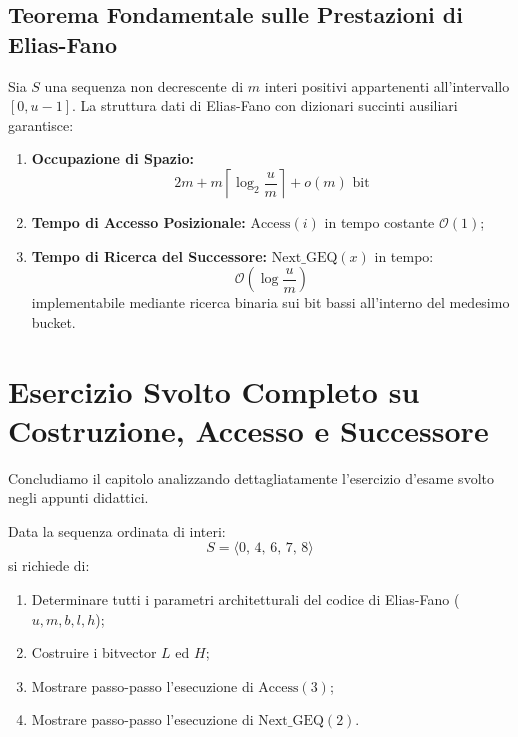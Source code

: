 \FloatBarrier
\subsection{Teorema Fondamentale sulle Prestazioni di Elias-Fano}
\label{subsec:teorema-elias-fano}

\begin{theorem}
Sia $S$ una sequenza non decrescente di $m$ interi positivi appartenenti all'intervallo $[0, u - 1]$. La struttura dati di Elias-Fano con dizionari succinti ausiliari garantisce:
\begin{enumerate}
  \item \textbf{Occupazione di Spazio:}
  \begin{equation}
    2m + m \left\lceil \log_2 \frac{u}{m} \right\rceil + o(m) \text{ bit}
  \end{equation}
  \item \textbf{Tempo di Accesso Posizionale:} $\text{Access}(i)$ in tempo costante $\mathcal{O}(1)$;
  \item \textbf{Tempo di Ricerca del Successore:} $\text{Next\_GEQ}(x)$ in tempo:
  \begin{equation}
    \mathcal{O}\left( \log \frac{u}{m} \right)
  \end{equation}
  implementabile mediante ricerca binaria sui bit bassi all'interno del medesimo bucket.
\end{enumerate}
\end{theorem}

\FloatBarrier
\section{Esercizio Svolto Completo su Costruzione, Accesso e Successore}
\label{sec:esercizio-svolto-elias-fano}

Concludiamo il capitolo analizzando dettagliatamente l'esercizio d'esame svolto negli appunti didattici.

\begin{example}
Data la sequenza ordinata di interi:
\begin{equation}
  S = \langle 0, \, 4, \, 6, \, 7, \, 8 \rangle
\end{equation}
si richiede di:
\begin{enumerate}
  \item Determinare tutti i parametri architetturali del codice di Elias-Fano ($u, m, b, l, h$);
  \item Costruire i bitvector $L$ ed $H$;
  \item Mostrare passo-passo l'esecuzione di $\text{Access}(3)$;
  \item Mostrare passo-passo l'esecuzione di $\text{Next\_GEQ}(2)$.
\end{enumerate}
\end{example}

